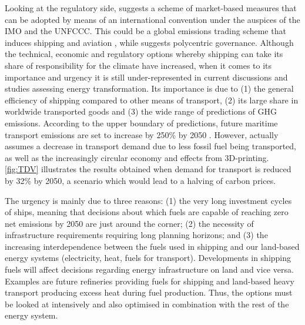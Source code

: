 \documentclass[article]{elsarticle}
\begin{document}
Looking at the regulatory side, \citet{SHI2016} suggests a scheme of market-based measures that can be adopted by means of an international convention under the auspices of the IMO and the UNFCCC. This could be a global emissions trading scheme that induces shipping and aviation \cite{Dessens2014}, while \citet{GRITSENKO2017} suggests polycentric governance.
Although the technical, economic and regulatory options whereby shipping can take its share of responsibility for the climate have increased, when it comes to its importance and urgency it is still under-represented in current discussions and studies assessing energy transformation. Its importance is due to (1) the general efficiency of shipping compared to other means of transport, (2) its large share in worldwide transported goods and (3) the wide range of predictions of GHG emissions. According to the upper boundary of predictions, future maritime transport emissions are set to increase by 250\% by 2050 \cite{EuropeanCommission2018}. However, \cite{ITF2018} actually assumes a decrease in transport demand due to less fossil fuel being transported, as well as the increasingly circular economy and effects from 3D-printing. \autoref{fig:TDV} illustrates the results obtained when demand for transport is reduced by 32\% by 2050, a scenario which would lead to a halving of carbon prices. %

The urgency is mainly due to three reasons: (1) the very long investment cycles of ships, meaning  that decisions about which fuels are capable of reaching zero net emissions by 2050 are just around the corner; (2) the necessity of infrastructure requirements requiring long planning horizons; and (3) the increasing interdependence between the fuels used in shipping and our land-based energy systems (electricity, heat, fuels for transport). Developments in shipping fuels will affect decisions regarding energy infrastructure on land and vice versa. Examples are future refineries providing fuels for shipping and land-based heavy transport producing excess heat during fuel production. Thus, the options must be looked at intensively and also optimised in combination with the rest of the energy system. 
\end{document}
